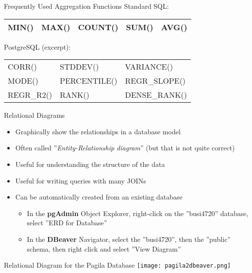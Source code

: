 \documentclass[ignorenonframetext,xcolor=x11names]{beamer}
\begin{document}
\begin{frame}{Frequently Used Aggregation Functions}
\renewcommand{\arraystretch}{1.5}
Standard SQL: \\

\small
\begin{tabular}{l|l|l|l|l} \hline
MIN() & MAX() & COUNT() & SUM() & AVG() \\ \hline
\end{tabular}
\normalsize

\vspace{\baselineskip}
PostgreSQL (excerpt):\\

\small
\begin{tabular}{l|l|l} \hline
CORR() & STDDEV() & VARIANCE() \\
MODE() & PERCENTILE() & REGR\_SLOPE() \\
REGR\_R2() & RANK() & DENSE\_RANK() \\ \hline
\end{tabular}

\end{frame}


\begin{frame}{Relational Diagrams}
\begin{itemize}
  \item Graphically show the relationships in a database model
  \item Often called ''\emph{Entity-Relationship diagram}'' (but that is not quite correct)
  \item Useful for understanding the structure of the data
  \item Useful for writing queries with many JOINs
  \item Can be automatically created from an existing database
  \begin{itemize}
     \item In the \textbf{pgAdmin} Object Explorer, right-click on the ''busi4720'' database, select ''ERD for Database''
     \item In the \textbf{DBeaver} Navigator, select the ''busi4720'', then the ''public'' schema, then right click and select ''View Diagram''
  \end{itemize}
\end{itemize}
\end{frame}

\begin{frame}{Relational Diagram for the Pagila Database}
\centering
\texttt{[image: pagila2dbeaver.png]}
\end{frame}
\end{document}
